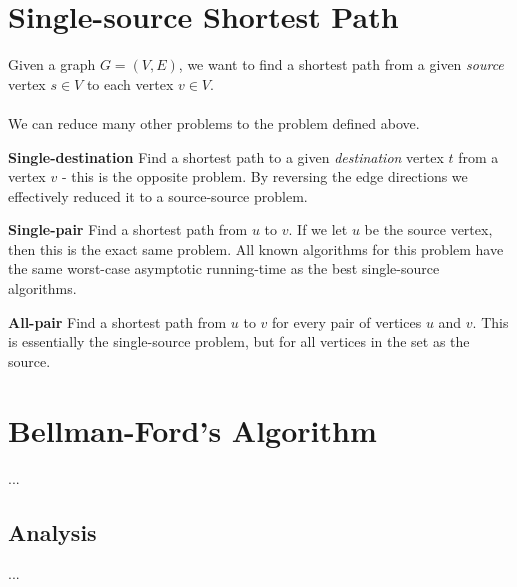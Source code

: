 \section{Single-source Shortest Path}
Given a graph $G = (V, E)$, we want to find a shortest path from a given
\textit{source} vertex $s \in V$ to each vertex $v \in V$.
\\\\
\noindent We can reduce many other problems to the problem defined above.
\begin{description}
	\item \textbf{Single-destination} Find a shortest path to a given
\textit{destination} vertex $t$ from a vertex $v$ - this is the opposite
problem. By reversing the edge directions we effectively reduced it to a
source-source problem.
	\item \textbf{Single-pair} Find a shortest path from $u$ to $v$. If we let
$u$ be the source vertex, then this is the exact same problem. All known
algorithms for this problem have the same worst-case asymptotic running-time
as the best single-source algorithms. %
	\item \textbf{All-pair} Find a shortest path from $u$ to $v$ for every
pair of vertices $u$ and $v$. This is essentially the single-source problem,
but for all vertices in the set as the source.
\end{description}

\newpage
\section{Bellman-Ford's Algorithm}
...

\subsection{Analysis}
...

\newpage
